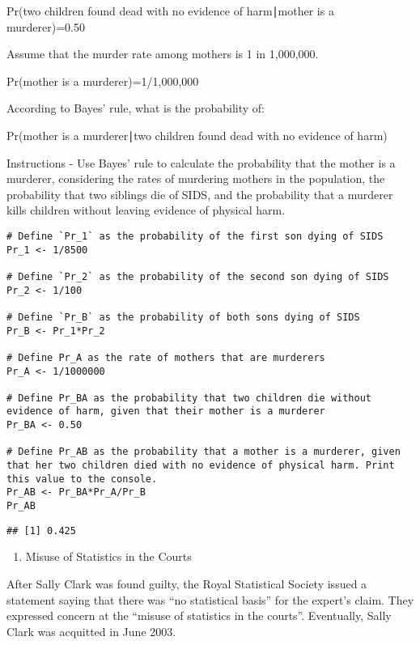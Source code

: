 \documentclass[
]{article}
\providecommand{\tightlist}{%
  \setlength{\itemsep}{0pt}\setlength{\parskip}{0pt}}
\begin{document}
Pr(two children found dead with no evidence of harm∣mother is a
murderer)=0.50

Assume that the murder rate among mothers is 1 in 1,000,000.

Pr(mother is a murderer)=1/1,000,000

According to Bayes' rule, what is the probability of:

Pr(mother is a murderer∣two children found dead with no evidence of
harm)

Instructions - Use Bayes' rule to calculate the probability that the
mother is a murderer, considering the rates of murdering mothers in the
population, the probability that two siblings die of SIDS, and the
probability that a murderer kills children without leaving evidence of
physical harm.

\begin{verbatim}
# Define `Pr_1` as the probability of the first son dying of SIDS
Pr_1 <- 1/8500

# Define `Pr_2` as the probability of the second son dying of SIDS
Pr_2 <- 1/100

# Define `Pr_B` as the probability of both sons dying of SIDS
Pr_B <- Pr_1*Pr_2

# Define Pr_A as the rate of mothers that are murderers
Pr_A <- 1/1000000

# Define Pr_BA as the probability that two children die without evidence of harm, given that their mother is a murderer
Pr_BA <- 0.50

# Define Pr_AB as the probability that a mother is a murderer, given that her two children died with no evidence of physical harm. Print this value to the console.
Pr_AB <- Pr_BA*Pr_A/Pr_B
Pr_AB
\end{verbatim}

\begin{verbatim}
## [1] 0.425
\end{verbatim}

\begin{enumerate}
\def\labelenumi{\arabic{enumi}.}
\setcounter{enumi}{4}
\tightlist
\item
  Misuse of Statistics in the Courts
\end{enumerate}

After Sally Clark was found guilty, the Royal Statistical Society issued
a statement saying that there was ``no statistical basis'' for the
expert's claim. They expressed concern at the ``misuse of statistics in
the courts''. Eventually, Sally Clark was acquitted in June 2003.
\end{document}
